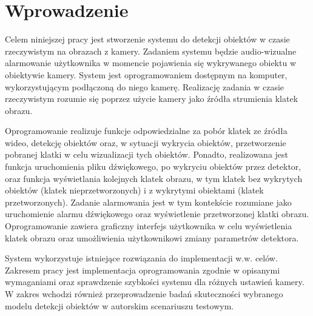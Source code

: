 \chapter{Wprowadzenie}
Celem niniejszej pracy jest stworzenie systemu do detekcji obiektów w czasie rzeczywistym na obrazach z kamery. Zadaniem systemu będzie audio-wizualne alarmowanie użytkownika w momencie pojawienia się wykrywanego obiektu w obiektywie kamery. System jest oprogramowaniem dostępnym na komputer, wykorzystującym podłączoną do niego kamerę. Realizację zadania w czasie rzeczywistym rozumie się poprzez użycie kamery jako źródła strumienia klatek obrazu. 

Oprogramowanie realizuje funkcje odpowiedzialne za pobór klatek ze źródła wideo, detekcję obiektów oraz, w sytuacji wykrycia obiektów, przetworzenie pobranej klatki w celu wizualizacji tych obiektów. Ponadto, realizowana jest funkcja uruchomienia pliku dźwiękowego, po wykryciu obiektów przez detektor, oraz funkcja wyświetlania kolejnych klatek obrazu, w tym klatek bez wykrytych obiektów (klatek nieprzetworzonych) i z wykrytymi obiektami (klatek przetworzonych). Zadanie alarmowania jest w tym kontekście rozumiane jako uruchomienie alarmu dźwiękowego oraz wyświetlenie przetworzonej klatki obrazu. Oprogramowanie zawiera graficzny interfejs użytkownika w celu wyświetlenia klatek obrazu oraz umożliwienia użytkownikowi zmiany parametrów detektora.

System wykorzystuje istniejące rozwiązania do implementacji w.w. celów. Zakresem pracy jest implementacja oprogramowania zgodnie w opisanymi wymaganiami oraz sprawdzenie szybkości systemu dla różnych ustawień kamery. W zakres wchodzi również przeprowadzenie badań skuteczności wybranego modelu detekcji obiektów w autorskim scenariuszu testowym.
